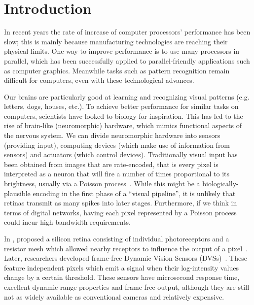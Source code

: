 \documentclass[conference]{IEEEtran}
\begin{document}
\section{Introduction}

In recent years the rate of increase of computer processors' performance has been slow; this is mainly because manufacturing technologies are reaching their physical limits. One way to improve performance is to use many processors in parallel, which has been successfully applied to parallel-friendly applications such as computer graphics. Meanwhile tasks such as pattern recognition remain difficult for computers, even with these technological advances.

Our brains are particularly good at learning and recognizing visual patterns (e.g. letters, dogs, houses, etc.). To achieve better performance for similar tasks on computers, scientists have looked to biology for inspiration. This has led to the rise of brain-like (neuromorphic) hardware, which mimics functional aspects of the nervous system. We can divide neuromorphic hardware into sensors (providing input), computing devices (which make use of information from sensors) and actuators (which control devices). Traditionally visual input has been obtained from images that are rate-encoded, that is every pixel is interpreted as a neuron that will fire a number of times proportional to its brightness, usually via a Poisson process~\cite{snyder2012random}. While this might be a biologically-plausible encoding in the first phase of a ``visual pipeline'', it is unlikely that retinas transmit as many spikes into later stages. Furthermore, if we think in terms of digital networks, having each pixel represented by a Poisson process could incur high bandwidth requirements. 

In \citeyear{Mead1989}, \citeauthor{Mead1989} proposed a silicon retina consisting of individual photoreceptors and a resistor mesh which allowed nearby receptors to influence the output of a pixel~\cite{Mead1989}. 
Later, researchers developed frame-free Dynamic Vision Sensors (DVSs)~\cite{delbruckDVS,bernabeDVS}. These feature independent pixels which emit a signal when their log-intensity values change by a certain threshold.
These sensors have microsecond response time, excellent dynamic range properties and frame-free output, although they are still not as widely available as conventional cameras and relatively expensive.
\end{document}
